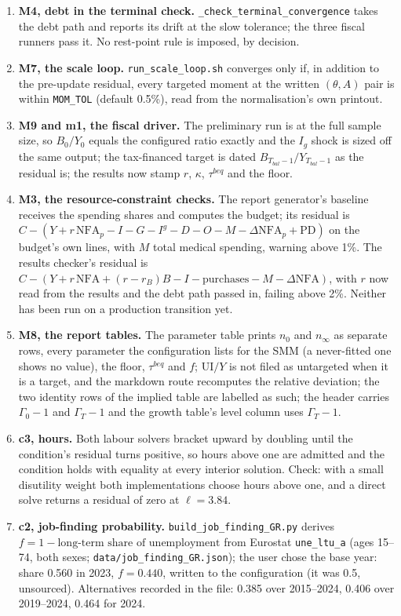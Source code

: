\documentclass[11pt,a4paper]{article}
\newcommand{\code}[1]{\texttt{#1}}
\begin{document}
\begin{enumerate}[label=p\arabic*.]
\item \textbf{M4, debt in the terminal check.} \code{_check_terminal_convergence} takes the debt path and reports its drift at the slow tolerance; the three fiscal runners pass it. No rest-point rule is imposed, by decision.
\item \textbf{M7, the scale loop.} \code{run_scale_loop.sh} converges only if, in addition to the pre-update residual, every targeted moment at the written $(\theta, A)$ pair is within \code{MOM_TOL} (default 0.5\%), read from the normalisation's own printout.
\item \textbf{M9 and m1, the fiscal driver.} The preliminary run is at the full sample size, so $B_0/Y_0$ equals the configured ratio exactly and the $I_g$ shock is sized off the same output; the tax-financed target is dated $B_{T_{bal}-1}/Y_{T_{bal}-1}$ as the residual is; the results now stamp $r$, $\kappa$, $\tau^{beq}$ and the floor.
\item \textbf{M3, the resource-constraint checks.} The report generator's baseline receives the spending shares and computes the budget; its residual is $C - (Y + r\,\mathrm{NFA}_p - I - G - I^g - D - O - M - \Delta\mathrm{NFA}_p + \mathrm{PD})$ on the budget's own lines, with $M$ total medical spending, warning above 1\%. The results checker's residual is $C - (Y + r\,\mathrm{NFA} + (r - r_B)B - I - \text{purchases} - M - \Delta\mathrm{NFA})$, with $r$ now read from the results and the debt path passed in, failing above 2\%. Neither has been run on a production transition yet.
\item \textbf{M8, the report tables.} The parameter table prints $n_0$ and $n_\infty$ as separate rows, every parameter the configuration lists for the SMM (a never-fitted one shows no value), the floor, $\tau^{beq}$ and $f$; UI$/Y$ is not filed as untargeted when it is a target, and the markdown route recomputes the relative deviation; the two identity rows of the implied table are labelled as such; the header carries $\Gamma_0 - 1$ and $\Gamma_T - 1$ and the growth table's level column uses $\Gamma_T - 1$.
\item \textbf{c3, hours.} Both labour solvers bracket upward by doubling until the condition's residual turns positive, so hours above one are admitted and the condition holds with equality at every interior solution. Check: with a small disutility weight both implementations choose hours above one, and a direct solve returns a residual of zero at $\ell = 3.84$.
\item \textbf{c2, job-finding probability.} \code{build_job_finding_GR.py} derives $f = 1 - \text{long-term share of unemployment}$ from Eurostat \code{une_ltu_a} (ages 15--74, both sexes; \code{data/job_finding_GR.json}); the user chose the base year: share 0.560 in 2023, $f = 0.440$, written to the configuration (it was 0.5, unsourced). Alternatives recorded in the file: 0.385 over 2015--2024, 0.406 over 2019--2024, 0.464 for 2024.

\end{enumerate}
\end{document}

